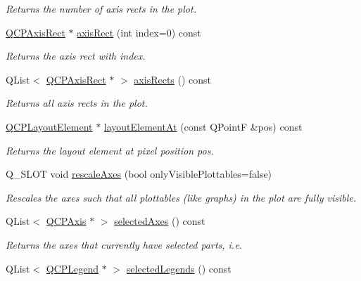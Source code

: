 \begin{DoxyCompactItemize}
\begin{DoxyCompactList}\small\item\em Returns the number of axis rects in the plot. \end{DoxyCompactList}\item 
\hyperlink{classQCPAxisRect}{Q\+C\+P\+Axis\+Rect} $\ast$ \hyperlink{classQCustomPlot_a4a37a1add5fe63060ac518cf0a4c4050}{axis\+Rect} (int index=0) const 
\begin{DoxyCompactList}\small\item\em Returns the axis rect with {\itshape index}. \end{DoxyCompactList}\item 
Q\+List$<$ \hyperlink{classQCPAxisRect}{Q\+C\+P\+Axis\+Rect} $\ast$ $>$ \hyperlink{classQCustomPlot_afd67094aaeccbc5719761348b2d8c891}{axis\+Rects} () const 
\begin{DoxyCompactList}\small\item\em Returns all axis rects in the plot. \end{DoxyCompactList}\item 
\hyperlink{classQCPLayoutElement}{Q\+C\+P\+Layout\+Element} $\ast$ \hyperlink{classQCustomPlot_a840458186d4483c8a42d6a399448d38f}{layout\+Element\+At} (const Q\+Point\+F \&pos) const 
\begin{DoxyCompactList}\small\item\em Returns the layout element at pixel position {\itshape pos}. \end{DoxyCompactList}\item 
Q\+\_\+\+S\+L\+O\+T void \hyperlink{classQCustomPlot_ad86528f2cee6c7e446dea4a6e8839935}{rescale\+Axes} (bool only\+Visible\+Plottables=false)
\begin{DoxyCompactList}\small\item\em Rescales the axes such that all plottables (like graphs) in the plot are fully visible. \end{DoxyCompactList}\item 
Q\+List$<$ \hyperlink{classQCPAxis}{Q\+C\+P\+Axis} $\ast$ $>$ \hyperlink{classQCustomPlot_aa6baf867e8beb96ed5bd471f83ece903}{selected\+Axes} () const 
\begin{DoxyCompactList}\small\item\em Returns the axes that currently have selected parts, i.\+e. \end{DoxyCompactList}\item 
Q\+List$<$ \hyperlink{classQCPLegend}{Q\+C\+P\+Legend} $\ast$ $>$ \hyperlink{classQCustomPlot_a1ea6297300c3e2770e65f95836411755}{selected\+Legends} () const 

\end{DoxyCompactItemize}
